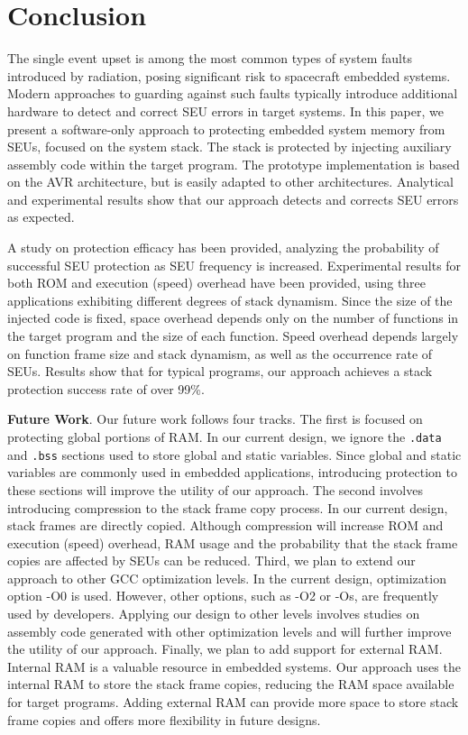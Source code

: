 \section{Conclusion}\label{sec:conclusion}
The single event upset is among the most common types of system faults introduced by radiation, posing significant risk to spacecraft embedded systems. Modern approaches to guarding against such faults typically introduce additional hardware to detect and correct SEU errors in target systems. In this paper, we present a software-only approach to protecting embedded system memory from SEUs, focused on the system stack. The stack is protected by injecting auxiliary assembly code within the target program. The prototype implementation is based on the AVR architecture, but is easily adapted to other architectures. Analytical and experimental results show that our approach detects and corrects SEU errors as expected. 

A study on protection efficacy has been provided, analyzing the probability of successful SEU protection as SEU frequency is increased. Experimental results for both ROM and execution (speed) overhead have been provided, using three applications exhibiting different degrees of stack dynamism. Since the size of the injected code is fixed, space overhead depends only on the number of functions in the target program and the size of each function. Speed overhead depends largely on function frame size and stack dynamism, as well as the occurrence rate of SEUs. Results show that for typical programs, our approach achieves a stack protection success rate of over 99\%.

{\bf Future Work}. Our future work follows four tracks. The first is focused on protecting global portions of RAM. In our current design, we ignore the \texttt{.data} and \texttt{.bss} sections used to store global and static variables. Since global and static variables are commonly used in embedded applications, introducing protection to these sections will improve the utility of our approach. The second involves introducing compression to the stack frame copy process. In our current design, stack frames are directly copied. Although compression will increase ROM and execution (speed) overhead, RAM usage and the probability that the stack frame copies are affected by SEUs can be reduced. Third, we plan to extend our approach to other GCC optimization levels. In the current design, optimization option -O0 is used. However, other options, such as -O2 or -Os, are frequently used by developers. Applying our design to other levels involves studies on assembly code generated with other optimization levels and will further improve the utility of our approach. Finally, we plan to add support for external RAM. Internal RAM is a valuable resource in embedded systems. Our approach uses the internal RAM to store the stack frame copies, reducing the RAM space available for target programs. Adding external RAM can provide more space to store stack frame copies and offers more flexibility in future designs.
